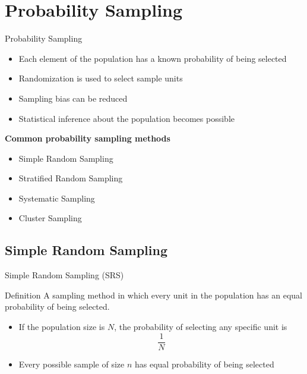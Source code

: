 \documentclass[12pt, aspectratio=169]{beamer}
\begin{document}
    \section{Probability Sampling}

    \begin{frame}{Probability Sampling}
        \begin{itemize}
            \item Each element of the population has a known probability of being selected

            \item Randomization is used to select sample units

            \item Sampling bias can be reduced

            \item Statistical inference about the population becomes possible
        \end{itemize}

        \textbf{Common probability sampling methods}

        \begin{itemize}
            \item Simple Random Sampling
            \item Stratified Random Sampling
            \item Systematic Sampling
            \item Cluster Sampling
        \end{itemize}
    \end{frame}


    \subsection{Simple Random Sampling}

    \begin{frame}{Simple Random Sampling (SRS)}
        \begin{block}{Definition}
            A sampling method in which every unit in the population has an equal probability of being selected.
        \end{block}

        \begin{itemize}
            \item If the population size is $N$, the probability of selecting any specific unit is
            \[
                \frac{1}{N}
            \]

            \item Every possible sample of size $n$ has equal probability of being selected
        \end{itemize}
    \end{frame}
\end{document}
